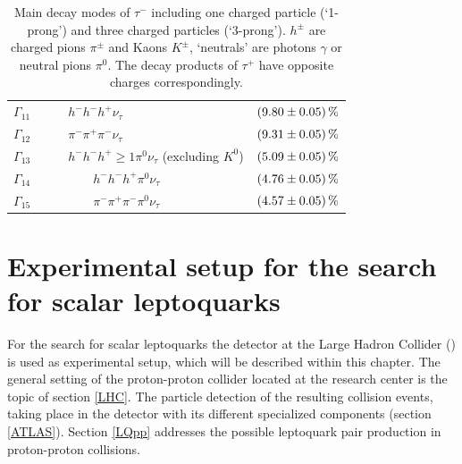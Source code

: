 \begin{table}[htbp]
\begin{tabular*}{\linewidth}{@{\extracolsep{\fill}}clc}
                \\
                $\Gamma_{11}$    & $\qquad h^-h^-h^+\nu_\tau$                          & $\SI[separate-uncertainty=true]{9.80\pm0.05}{\percent}$
                \\
                $\Gamma_{12}$    & $\qquad \pi^-\pi^+\pi^-\nu_\tau$                          & $\SI[separate-uncertainty=true]{9.31\pm0.05}{\percent}$
                \\
                $\Gamma_{13}$    & $\qquad h^-h^-h^+\geq 1\pi^0\nu_\tau$ (excluding $K^0$) & $\SI[separate-uncertainty=true]{5.09\pm0.05}{\percent}$
                \\
                $\Gamma_{14}$    & $\qquad\qquad h^-h^-h^+\pi^0\nu_\tau$                 & $\SI[separate-uncertainty=true]{4.76\pm0.05}{\percent}$
                \\
                $\Gamma_{15}$    & $\qquad\qquad \pi^-\pi^+\pi^-\pi^0\nu_\tau$           & $\SI[separate-uncertainty=true]{4.57\pm0.05}{\percent}$
                \\
		\hline
		\hline
		\end{tabular*}
		\caption[Main decay modes of $\tau^-$.]{Main decay modes of $\tau^-$ including one charged particle (`1-prong') and three charged particles (`3-prong'). $h^{\pm}$ are charged pions $\pi^\pm$ and Kaons $K^\pm$, `neutrals' are photons $\gamma$ or neutral pions $\pi^0$. The decay products of $\tau^+$ have opposite charges correspondingly. \cite{PhysRevD}}
\label{taudecays}
\end{table}
%
\chapter{Experimental setup for the search for scalar leptoquarks}\label{experiment}
For the search for scalar leptoquarks the {\ATLAS} detector at the Large Hadron Collider ({\LHC}) is used as experimental setup, which will be described within this chapter. The general setting of the proton-proton collider located at the {\CERN} research center is the topic of section \ref{LHC}. The particle detection of the resulting collision events, taking place in the {\ATLAS} detector with its different specialized components (section \ref{ATLAS}). Section \ref{LQpp} addresses the possible leptoquark pair production in proton-proton collisions.  
